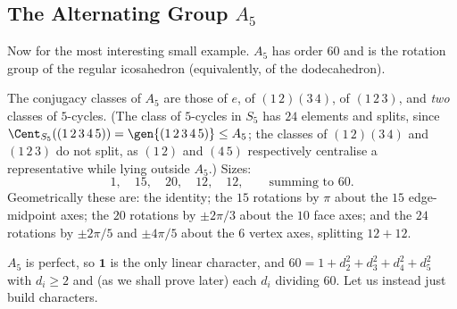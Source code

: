 \subsection{The Alternating Group \texorpdfstring{$A_5$}{A5}}

Now for the most interesting small example. $A_5$ has order $60$ and is the rotation group of the regular icosahedron (equivalently, of the dodecahedron).

\begin{center}
\end{center}

The conjugacy classes of $A_5$ are those of $e$, of $(1\,2)(3\,4)$, of $(1\,2\,3)$, and \emph{two} classes of $5$-cycles. (The class of $5$-cycles in $S_5$ has $24$ elements and splits, since $\Cent_{S_5}((1\,2\,3\,4\,5)) = \gen{(1\,2\,3\,4\,5)}\leq A_5$; the classes of $(1\,2)(3\,4)$ and $(1\,2\,3)$ do not split, as $(1\,2)$ and $(4\,5)$ respectively centralise a representative while lying outside $A_5$.) Sizes:
$$1,\quad 15,\quad 20,\quad 12,\quad 12, \qquad \text{summing to } 60.$$
Geometrically these are: the identity; the $15$ rotations by $\pi$ about the $15$ edge-midpoint axes; the $20$ rotations by $\pm2\pi/3$ about the $10$ face axes; and the $24$ rotations by $\pm2\pi/5$ and $\pm4\pi/5$ about the $6$ vertex axes, splitting $12+12$.

$A_5$ is perfect, so $\mathbf 1$ is the only linear character, and $60 = 1 + d_2^2+d_3^2+d_4^2+d_5^2$ with $d_i\geq 2$ and (as we shall prove later) each $d_i$ dividing $60$. Let us instead just build characters.

